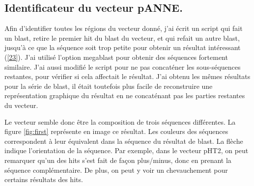 \documentclass[10.9pt]{article} %
\begin{document}
\subsection[Identification du vecteur pANNE]{Identificateur du vecteur pANNE.}

Afin d'identifier toutes les régions du vecteur donné, j'ai écrit un script qui fait un blast, 
retire le premier hit du blast du vecteur, et qui refait un autre blast, jusqu'à ce que 
la séquence soit trop petite pour obtenir un résultat intéressant (\ref{23}). 
J'ai utilisé l'option megablast pour obtenir des séquences fortement similaire. 
J'ai aussi modifié le script pour ne pas concaténer les sous-séquences restantes, 
pour vérifier si cela affectait le résultat. J'ai obtenu les mêmes résultats pour la série de blast,
il était toutefois plus facile de reconstruire une représentation graphique du résultat 
en ne concaténant pas les parties restantes du vecteur.

Le vecteur semble donc être la composition de trois séquences différentes. La figure 
\ref{fig:first} représente en image ce résultat. Les couleurs des séquences correspondent à leur
équivalent dans la séquence du résultat de blast. La flèche indique l'orientation de la séquence. 
Par exemple, dans le vecteur pHT2, on peut remarquer qu'un des hits s'est fait de façon plus/minus,
donc en prenant la séquence complémentaire. De plus, on peut y voir un chevauchement 
pour certains résultats des hits.
\end{document}
